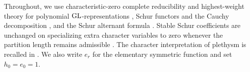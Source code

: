 Throughout, we use characteristic-zero complete reducibility and
highest-weight theory for polynomial \(\operatorname{GL}\)-representations
\cite[Theorem~9.19 and Proposition~14.13]{FultonHarris1991},
Schur functors and the Cauchy decomposition
\cite[Theorem~6.3 and Exercise~6.11(b)]{FultonHarris1991},
and the Schur alternant formula \cite[Chapter~I, (3.1)]{Macdonald1995}.
Stable Schur coefficients are unchanged on specializing extra character
variables to zero whenever the partition length remains admissible
\cite[Chapter~I, (3.2)--(3.3)]{Macdonald1995}.
The character interpretation of plethysm is recalled in
\cite[Chapter~I, Appendix~A, Sections~7--8]{Macdonald1995}.
We also write \(e_r\) for the elementary symmetric function and set
\(h_0=e_0=1\).
